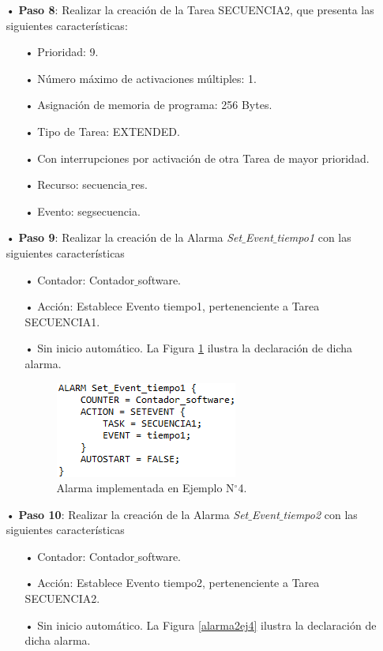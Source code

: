 \documentclass[12pt,letterpaper]{article}
\begin{document}
\begin{enumerate}
\begin{enumerate}
\end{enumerate}
\item[•]\textbf{Paso 8}: Realizar la creación de la Tarea SECUENCIA2, que presenta las siguientes características:
\begin{enumerate}
\item[•]Prioridad: 9.
\item[•]Número máximo de activaciones múltiples: 1.
\item[•]Asignación de memoria de programa: 256 Bytes.
\item[•]Tipo de Tarea: EXTENDED.
\item[•]Con interrupciones por activación de otra Tarea de mayor prioridad.
\item[•]Recurso: secuencia$\_$res.
\item[•]Evento: segsecuencia.
\end{enumerate}
\item[•]\textbf{Paso 9}: Realizar la creación de la Alarma \textit{Set$\_$Event$\_$tiempo1} con las siguientes características
\begin{enumerate}
\item[•]Contador: Contador$\_$software.
\item[•]Acción: Establece Evento tiempo1, pertenenciente a Tarea SECUENCIA1.
\item[•]Sin inicio automático. La Figura \ref{alarmaej4} ilustra la declaración de dicha alarma.
\begin{figure}[H]
\centering
\includegraphics[width=5 cm]{figuras/f50.png}
\caption{Alarma implementada en Ejemplo N$^{\circ}$4.}
\label{alarmaej4}
\end{figure}
\end{enumerate}
\item[•]\textbf{Paso 10}: Realizar la creación de la Alarma \textit{Set$\_$Event$\_$tiempo2} con las siguientes características
\begin{enumerate}
\item[•]Contador: Contador$\_$software.
\item[•]Acción: Establece Evento tiempo2, pertenenciente a Tarea SECUENCIA2.
\item[•]Sin inicio automático. La Figura \ref{alarma2ej4} ilustra la declaración de dicha alarma.

\end{enumerate}
\end{enumerate}
\end{document}
